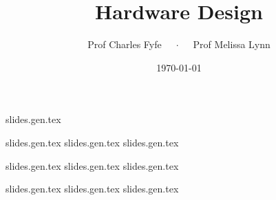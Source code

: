 \documentclass{beamer}
\title{Hardware Design}
\date{\today}
\author{Prof Charles Fyfe $\quad \cdot \quad$ Prof Melissa Lynn}
\institute{St Olaf College}
\begin{document}
\titlepage

\TOC{}

{slides.gen.tex}

{slides.gen.tex}
{slides.gen.tex}
{slides.gen.tex}

{slides.gen.tex}
{slides.gen.tex}
{slides.gen.tex}

{slides.gen.tex}
{slides.gen.tex}
{slides.gen.tex}
\end{document}
